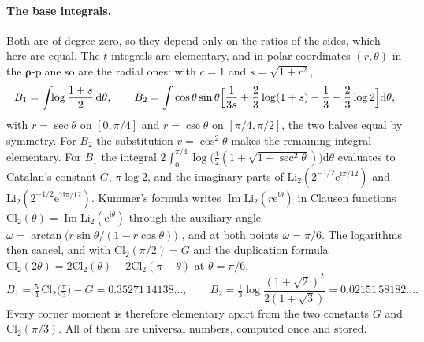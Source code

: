 \documentclass[11pt,a4paper]{article}
\newcommand{\brho}{\boldsymbol{\rho}}
\newcommand{\dd}{\mathrm{d}}
\newcommand{\ii}{\mathrm{i}}
\newcommand{\ee}{\mathrm{e}}
\begin{document}
\paragraph{The base integrals.} Both are of degree zero, so they depend only on the ratios of the sides,
which here are equal. The $t$-integrals are elementary, and in polar coordinates $(r,\theta)$ in the
$\brho$-plane so are the radial ones: with $c=1$ and $s=\sqrt{1+r^2}$,
\[
  B_1=\int\!\!\log\frac{1+s}{2}\,\dd\theta,\qquad
  B_2=\int\cos\theta\sin\theta\Bigl[\frac{1}{3s}+\frac23\log(1+s)-\frac13-\frac23\log2\Bigr]\dd\theta,
\]
with $r=\sec\theta$ on $[0,\pi/4]$ and $r=\csc\theta$ on $[\pi/4,\pi/2]$, the two halves equal by symmetry.
For $B_2$ the substitution $v=\cos^2\theta$ makes the remaining integral elementary. For $B_1$ the integral
$2\int_0^{\pi/4}\log\bigl(\tfrac12(1+\sqrt{1+\sec^2\theta})\bigr)\dd\theta$ evaluates to Catalan's constant
$G$, $\pi\log2$, and the imaginary parts of $\mathrm{Li}_2(2^{-1/2}\ee^{\ii\pi/12})$ and
$\mathrm{Li}_2(2^{-1/2}\ee^{7\ii\pi/12})$. Kummer's formula writes $\operatorname{Im}\mathrm{Li}_2(r\ee^{\ii\theta})$
in Clausen functions $\mathrm{Cl}_2(\theta)=\operatorname{Im}\mathrm{Li}_2(\ee^{\ii\theta})$ through the auxiliary
angle $\omega=\arctan\bigl(r\sin\theta/(1-r\cos\theta)\bigr)$ \citep{Lewin1981}, and at both points $\omega=\pi/6$.
The logarithms then cancel, and with $\mathrm{Cl}_2(\pi/2)=G$ and the duplication formula
$\mathrm{Cl}_2(2\theta)=2\mathrm{Cl}_2(\theta)-2\mathrm{Cl}_2(\pi-\theta)$ at $\theta=\pi/6$,
\begin{equation}\label{eq:B12closed}
  B_1=\tfrac54\,\mathrm{Cl}_2\bigl(\tfrac\pi3\bigr)-G=0.35271\,14138\ldots,\qquad
  B_2=\tfrac13\log\frac{(1+\sqrt2)^2}{2(1+\sqrt3)}=0.02151\,58182\ldots.
\end{equation}
Every corner moment is therefore elementary apart from the two constants $G$ and $\mathrm{Cl}_2(\pi/3)$. All
of them are universal numbers, computed once and stored.
\end{document}
